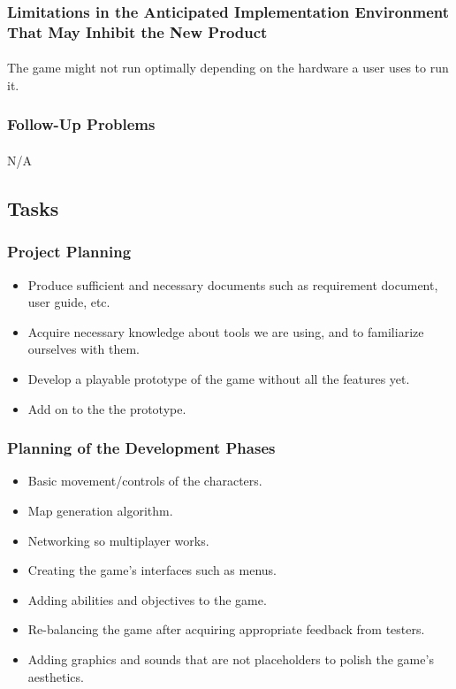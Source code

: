 \documentclass[12pt, titlepage]{article}
\begin{document}
\subsubsection{Limitations in the Anticipated Implementation Environment That May Inhibit the New Product}
\paragraph{}The game might not run optimally depending on the hardware a user uses to run it. 
\subsubsection{Follow-Up Problems}
\paragraph{}N/A
\subsection{Tasks}
\subsubsection{Project Planning}
\begin{itemize}
    \item Produce sufficient and necessary documents such as requirement document, user guide, etc. 
    \item Acquire necessary knowledge about tools we are using, and to familiarize ourselves with them. 
    \item Develop a playable prototype of the game without all the features yet. 
    \item Add on to the the prototype.
\end{itemize}
\subsubsection{Planning of the Development Phases}
\begin{itemize}
    \item Basic movement/controls of the characters.
    \item Map generation algorithm.
    \item Networking so multiplayer works.
    \item Creating the game's interfaces such as menus.
    \item Adding abilities and objectives to the game.
    \item Re-balancing the game after acquiring appropriate feedback from testers.
    \item Adding graphics and sounds that are not placeholders to polish the game's aesthetics.
\end{itemize}
\end{document}
